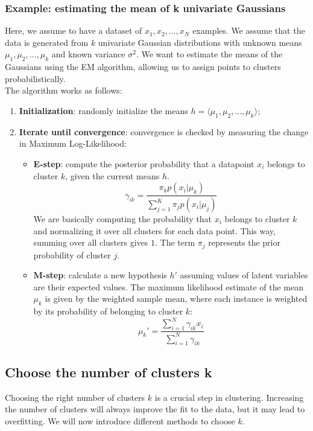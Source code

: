 \subsubsection*{Example: estimating the mean of k univariate Gaussians}
Here, we assume to have a dataset of $x_1, x_2, \ldots, x_N$ examples.
We assume that the data is generated from $k$ univariate Gaussian distributions with 
unknown means $\mu_1, \mu_2, \ldots, \mu_k$ and known variance $\sigma^2$.
We want to estimate the means of the Gaussians using the EM algorithm, allowing us to assign points to clusters probabilistically.
\\The algorithm works as follows:
\begin{enumerate}
    \item \textbf{Initialization}: randomly initialize the means $h = \langle\mu_1, \mu_2, \ldots, \mu_k \rangle$;
    \item \textbf{Iterate until convergence}: convergence is checked by measuring the change in Maximum Log-Likelihood:
    \begin{itemize}
        \item \textbf{E-step}: compute the posterior probability that a datapoint $x_i$ belongs to cluster $k$, 
        given the current means $h$.
        \[ \gamma_{ik} = \frac{\pi_k p(x_i | \mu_k)}{\sum_{j=1}^{K} \pi_j p(x_i | \mu_j)} \]
        We are basically computing the probability that $x_i$ belongs to cluster $k$ and normalizing it over all clusters for each data point.
        This way, summing over all clusters gives $1$.
        The term $\pi_j$ represents the prior probability of cluster $j$.
        \item \textbf{M-step}: calculate a new hypothesis $h'$ assuming values of latent variables are their expected values.
        The maximum likelihood estimate of the mean $\mu_k$ is given by the weighted sample mean, where each instance is weighted by its probability of
        belonging to cluster $k$:
        \[ \mu_k' = \frac{\sum_{i=1}^{N} \gamma_{ik} x_i}{\sum_{i=1}^{N} \gamma_{ik}} \]
    \end{itemize}
\end{enumerate}

\subsection{Choose the number of clusters k}
Choosing the right number of clusters $k$ is a crucial step in clustering. Increasing the number of clusters will always
improve the fit to the data, but it may lead to overfitting. We will now introduce different methods to choose $k$.


